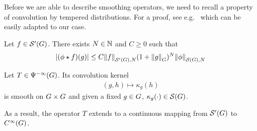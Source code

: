 Before we are able to describe smoothing operators,
we need to recall a property of convolution by tempered distributions.
For a proof, see e.g.~\cite[Lemma 3.1.55]{FischerRuzhansky16} which can be easily adapted to our case.

\begin{lemma}
\label{lemma:continuity_of_convolutions}
    Let $f \in \TemperedDistributions \Group$.
    There exists $N \in \N$ and $C \geq 0$ such that
    \begin{align*}
        \abs {(\conv \phi f)(g)}
        \leq
        C
        \seminorm [\TemperedDistributions \Group] N f
        (1 + \norm [\Group] g)^N
        \seminorm [\Schwartz \Group] N \phi
    \end{align*}
\end{lemma}

\begin{proposition}
    Let $T \in \SmoothingOperators$.
    Its convolution kernel
    \begin{align*}
        (g, h) \mapsto \kappa_g(h)
    \end{align*}
    is smooth on $\Group \times \Group$ and given a fixed $g \in \Group$, $\kappa_g(\dummy) \in \Schwartz \Group$.

    As a result,
    the operator $T$ extends to a continuous mapping from $\TemperedDistributions \Group$ to $\SmoothFunctions \Group$.
\end{proposition}
